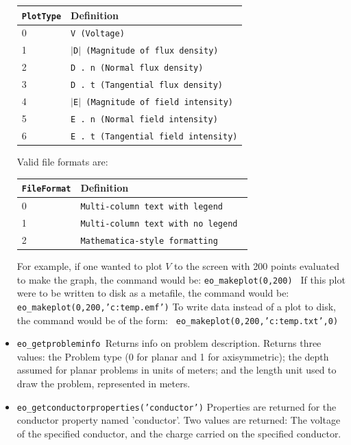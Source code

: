 \begin{itemize}
\begin{tabular}{ll}
\texttt{PlotType} &  Definition \\ \hline
 0 & \texttt{V (Voltage)} \\
 1 & \texttt{$\vert$D$\vert$ (Magnitude of flux density)} \\
 2 & \texttt{D . n (Normal flux density)} \\
 3 & \texttt{D . t (Tangential flux density)} \\
 4 & \texttt{$\vert$E$\vert$ (Magnitude of field intensity)} \\
 5 & \texttt{E . n (Normal field intensity)} \\
 6 & \texttt{E . t (Tangential field intensity)}
\end{tabular}

\vspace*{8pt}
Valid file formats are:

\begin{tabular}{ll}
\texttt{FileFormat} &  Definition  \\ \hline
 0 & \texttt{Multi-column text with legend } \\
 1 & \texttt{Multi-column text with no legend } \\
 2 & \texttt{Mathematica-style formatting}
\end{tabular}

For example, if one wanted to plot $V $ to the screen with 200 points evaluated
to make the graph, the command would be: \newline
\texttt{eo\_makeplot(0,200) } \newline
If this plot were to be written to disk as a metafile, the command
would be:\texttt{ } \newline
\texttt{eo\_makeplot(0,200,'c:temp.emf')} \newline
To write data instead of a plot to disk, the command would be of
the form:\texttt{ } \newline
\texttt{eo\_makeplot(0,200,'c:temp.txt',0)} \newline


\item \texttt{eo\_getprobleminfo }Returns info on problem description. Returns three
values: the Problem type (0 for planar and 1 for axisymmetric); the depth
assumed for planar problems in units of meters; and the length unit used to draw the problem, represented in meters.

\item \texttt{eo\_getconductorproperties('conductor')} Properties are returned for the
conductor property named 'conductor'. Two values are returned: The voltage
of the specified conductor, and the charge carried on the specified
conductor.
\end{itemize}

